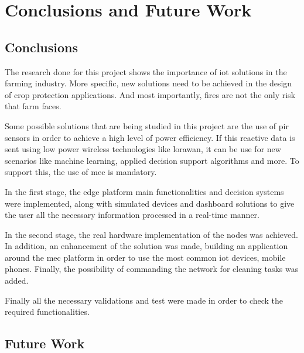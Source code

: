 \section{Conclusions and Future Work}
\subsection*{Conclusions}
The research done for this project shows the importance of \acrshort{iot} solutions in the farming industry. More specific, new solutions need 
to be achieved in the design of crop protection applications. And most importantly, fires are not the only risk that farm faces.

Some possible solutions that are being studied in this project are the use of \acrshort{pir} sensors in order to achieve a high level of 
power efficiency. If this reactive data is sent using low power wireless technologies like \acrshort{lorawan}, it can be use 
for new scenarios like machine learning, applied decision support algorithms and more. To support this, the use of \acrshort{mec} is mandatory.

In the first stage, the edge platform main functionalities and decision systems were implemented, along with simulated devices and dashboard solutions to 
give the user all the necessary information processed in a real-time manner.

In the second stage, the real hardware implementation of the nodes was achieved. In addition, an enhancement of the solution was made, building an application around the \acrshort{mec} platform in order to use the most common \acrshort{iot} 
devices, mobile phones. Finally, the possibility of commanding the network for cleaning tasks was added.

Finally all the necessary validations and test were made in order to check the required functionalities.

\subsection*{Future Work}

